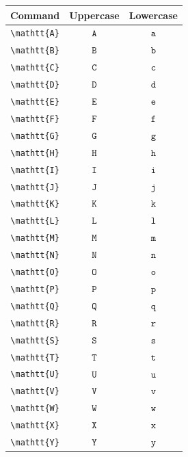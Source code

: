 \documentclass[12pt,a4paper]{article}
\begin{document}
\begin{longtable}{|c|c|c|}
\hline
\textbf{Command} & \textbf{Uppercase} & \textbf{Lowercase} \\
\hline
\verb|\mathtt{A}| & $\mathtt{A}$ & $\mathtt{a}$ \\ %
\verb|\mathtt{B}| & $\mathtt{B}$ & $\mathtt{b}$ \\ %
\verb|\mathtt{C}| & $\mathtt{C}$ & $\mathtt{c}$ \\ %
\verb|\mathtt{D}| & $\mathtt{D}$ & $\mathtt{d}$ \\ %
\verb|\mathtt{E}| & $\mathtt{E}$ & $\mathtt{e}$ \\ %
\verb|\mathtt{F}| & $\mathtt{F}$ & $\mathtt{f}$ \\ %
\verb|\mathtt{G}| & $\mathtt{G}$ & $\mathtt{g}$ \\ %
\verb|\mathtt{H}| & $\mathtt{H}$ & $\mathtt{h}$ \\ %
\verb|\mathtt{I}| & $\mathtt{I}$ & $\mathtt{i}$ \\ %
\verb|\mathtt{J}| & $\mathtt{J}$ & $\mathtt{j}$ \\ %
\verb|\mathtt{K}| & $\mathtt{K}$ & $\mathtt{k}$ \\ %
\verb|\mathtt{L}| & $\mathtt{L}$ & $\mathtt{l}$ \\ %
\verb|\mathtt{M}| & $\mathtt{M}$ & $\mathtt{m}$ \\ %
\verb|\mathtt{N}| & $\mathtt{N}$ & $\mathtt{n}$ \\ %
\verb|\mathtt{O}| & $\mathtt{O}$ & $\mathtt{o}$ \\ %
\verb|\mathtt{P}| & $\mathtt{P}$ & $\mathtt{p}$ \\ %
\verb|\mathtt{Q}| & $\mathtt{Q}$ & $\mathtt{q}$ \\ %
\verb|\mathtt{R}| & $\mathtt{R}$ & $\mathtt{r}$ \\ %
\verb|\mathtt{S}| & $\mathtt{S}$ & $\mathtt{s}$ \\ %
\verb|\mathtt{T}| & $\mathtt{T}$ & $\mathtt{t}$ \\ %
\verb|\mathtt{U}| & $\mathtt{U}$ & $\mathtt{u}$ \\ %
\verb|\mathtt{V}| & $\mathtt{V}$ & $\mathtt{v}$ \\ %
\verb|\mathtt{W}| & $\mathtt{W}$ & $\mathtt{w}$ \\ %
\verb|\mathtt{X}| & $\mathtt{X}$ & $\mathtt{x}$ \\ %
\verb|\mathtt{Y}| & $\mathtt{Y}$ & $\mathtt{y}$ \\ %

\end{longtable}
\end{document}
